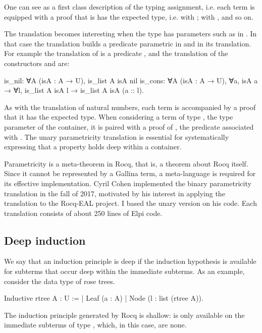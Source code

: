 \documentclass[a4paper, 11pt]{book}
\begin{document}
One can see  as a first class description of the
typing assignment, i.e. each term is equipped with a proof that
is has the expected type, i.e.  with ;
 with , and so on.

The translation becomes interesting when the type has parameters such as
 in . In that case the translation builds
a predicate parametric in  and in its translation. For example
the translation of  is a predicate
,
and the translation of the constructors  and 
are:
\begin{rocqcode}
is_nil: ∀A (isA : A → U), is_list A isA nil
is_cons: ∀A (isA : A → U), ∀a, isA a → 
  ∀l, is_list A isA l → is_list A isA (a :: l).
\end{rocqcode}


As with the translation of natural numbers, each term is accompanied by a proof
that it has the expected type. When considering a term  of
type , the type parameter of the container, it is paired with a proof of
, the predicate associated with . The unary parametricity
translation is essential for systematically expressing that a property holds deep
within a container.

Parametricity is a meta-theorem in Rocq, that is, a theorem about Rocq itself.
Since it cannot be represented by a Gallina term, a meta-language is required for
its effective implementation. Cyril Cohen implemented the binary parametricity
translation in the fall of 2017, motivated by his interest in applying the
translation to the Rocq-EAL project. I based the unary version on his code. Each
translation consists of about 250 lines of Elpi code.

\subsection{Deep induction}


We say that an induction principle is deep if the induction hypothesis is
available for subterms that occur deep within the immediate subterms. As an
example, consider the data type of rose trees.

\begin{rocqcode}
Inductive rtree A : U :=
| Leaf (a : A)
| Node (l : list (rtree A)).
\end{rocqcode}

The induction principle generated by Rocq is shallow:  is only
available on the immediate subterms of type , which, in this case,
are none.
\end{document}
